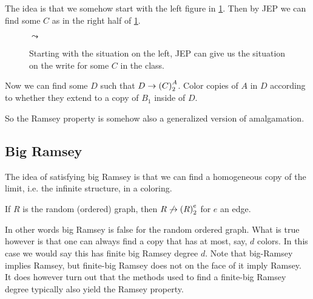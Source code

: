 \documentclass{amsart}
\begin{document}
The idea is that we somehow start with the left figure in \cref{fig:ap}.
Then by JEP we can find some $C$ as in the right half of \cref{fig:ap}.
\begin{figure}
\begin{overlay}
\end{overlay}
\qquad $\leadsto$ \qquad
\begin{overlay}
\end{overlay}
\caption{Starting with the situation on the left, JEP can give us the situation on the
write for some $C$ in the \Fraisse class.}
\label{fig:ap}
\end{figure}
Now we can find some $D$ such that $D\rightarrow \left( C \right)_2^A$.
Color copies of $A$ in $D$ according to whether they extend to a copy of $B_1$
inside of $D$. 

So the Ramsey property is somehow also a generalized version of amalgamation.

\subsection{Big Ramsey}

The idea of satisfying big Ramsey is that we can find 
a homogeneous copy of the \Fraisse limit, i.e. the infinite structure, in a
coloring.

\begin{fact}
If $R$ is the random (ordered) graph, then $R\not\rightarrow \left( R \right)^e_2$ for $e$ an edge.
\end{fact}

In other words big Ramsey is false for the random ordered graph.
What is true however is that one can always find a copy that has at most, say, $d$ colors.
In this case we would say this has finite big Ramsey degree $d$.
Note that big-Ramsey implies Ramsey, but finite-big Ramsey does not on the face of
it imply Ramsey. It does however turn out that the methods used to find a
finite-big Ramsey degree typically also yield the Ramsey property.
\end{document}
